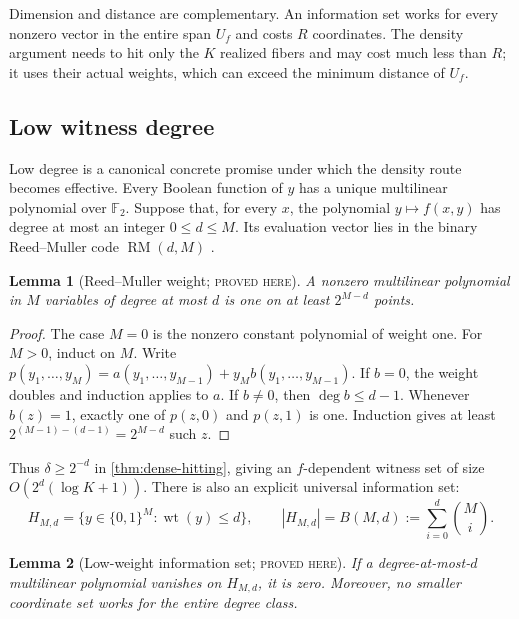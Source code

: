 \documentclass[11pt]{article}
\newtheorem{lemma}[lemma]{Lemma}
\theoremstyle{definition}
\theoremstyle{remark}
\newcommand{\bits}{\{0,1\}}
\newcommand{\F}{\mathbb F}
\newcommand{\wt}{\operatorname{wt}}
\newcommand{\status}[1]{\textsc{#1}}
\begin{document}
Dimension and distance are complementary.  An information set works for
every nonzero vector in the entire span $U_f$ and costs $R$ coordinates.  The
density argument needs to hit only the $K$ realized fibers and may cost much
less than $R$; it uses their actual weights, which can exceed the minimum
distance of $U_f$.

\subsection{Low witness degree}

Low degree is a canonical concrete promise under which the density route
becomes effective.  Every Boolean function of $y$ has a unique multilinear
polynomial over $\F_2$.  Suppose that, for every $x$, the polynomial
$y\mapsto f(x,y)$ has degree at most an integer $0\le d\le M$.  Its evaluation
vector lies in the binary Reed--Muller code $\operatorname{RM}(d,M)$
\cite{Muller1954,Reed1954}.

\begin{lemma}[Reed--Muller weight; \status{proved here}]
\label{lem:rm-weight}
A nonzero multilinear polynomial in $M$ variables of degree at most $d$ is
one on at least $2^{M-d}$ points.
\end{lemma}

\begin{proof}
The case $M=0$ is the nonzero constant polynomial of weight one.  For $M>0$,
induct on $M$.  Write
$p(y_1,\ldots,y_M)=a(y_1,\ldots,y_{M-1})+y_Mb(y_1,\ldots,y_{M-1})$.
If $b=0$, the weight doubles and induction applies to $a$.  If $b\ne0$, then
$\deg b\le d-1$.  Whenever $b(z)=1$, exactly one of $p(z,0)$ and $p(z,1)$ is
one.  Induction gives at least $2^{(M-1)-(d-1)}=2^{M-d}$ such $z$.
\end{proof}

Thus $\delta\ge2^{-d}$ in \cref{thm:dense-hitting}, giving an
$f$-dependent witness set of size $O(2^d(\log K+1))$.  There is also an
explicit universal information set:
\[
  H_{M,d}=\{y\in\bits^M:\wt(y)\le d\},
  \qquad
  |H_{M,d}|=B(M,d):=\sum_{i=0}^d\binom Mi.
  \tag{3.7}\label{eq:low-weight-set}
\]

\begin{lemma}[Low-weight information set; \status{proved here}]
\label{lem:low-weight-info}
If a degree-at-most-$d$ multilinear polynomial vanishes on $H_{M,d}$, it is
zero.  Moreover, no smaller coordinate set works for the entire degree class.
\end{lemma}
\end{document}
